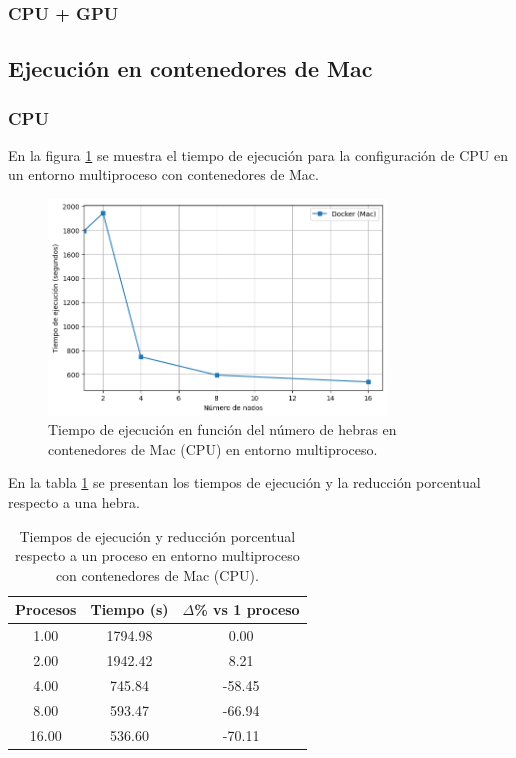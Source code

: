 \subsubsection{CPU + GPU}

\subsection{Ejecución en contenedores de Mac}
\subsubsection{CPU}

En la figura \ref{fig:multi-node_mac_docker_time} se muestra el tiempo de ejecución para la configuración de CPU en un entorno multiproceso con contenedores de Mac.

\begin{figure}[H]
    \centering
    \includegraphics[width=0.8\textwidth]{imagenes/cap5/multi-node_mac_docker_time.png}
    \caption{Tiempo de ejecución en función del número de hebras en contenedores de Mac (CPU) en entorno multiproceso.}
    \label{fig:multi-node_mac_docker_time}
\end{figure}

En la tabla \ref{tab:multi-node_mac_docker} se presentan los tiempos de ejecución y la reducción porcentual respecto a una hebra.

\begin{table}[ht]
    \centering
    \begin{tabular}{|c|c|c|}
        \hline
        \textbf{Procesos} & \textbf{Tiempo (s)} & \textbf{$\Delta$\% vs 1 proceso} \\
        \hline
        1.00              & 1794.98             & 0.00                             \\
        2.00              & 1942.42             & 8.21                             \\
        4.00              & 745.84              & -58.45                           \\
        8.00              & 593.47              & -66.94                           \\
        16.00             & 536.60              & -70.11                           \\
        \hline
    \end{tabular}
    \caption{Tiempos de ejecución y reducción porcentual respecto a un proceso en entorno multiproceso con contenedores de Mac (CPU).}
    \label{tab:multi-node_mac_docker}
\end{table}

